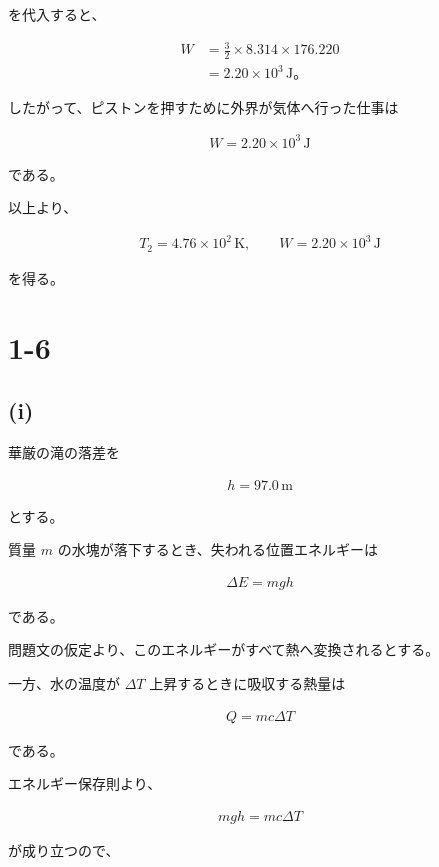 \documentclass[platex,dvipdfmx,a4paper]{jsarticle}
\begin{document}
を代入すると、

\begin{align*}
W
&=
\frac32
\times
8.314
\times
176.220 \\
&=
2.20\times10^3\,\mathrm{J}。
\end{align*}

したがって、ピストンを押すために外界が気体へ行った仕事は

\begin{align*}
W
=
2.20\times10^3\,\mathrm{J}
\end{align*}

である。

以上より、

\begin{align*}
T_2
=
4.76\times10^2\,\mathrm{K},
\qquad
W
=
2.20\times10^3\,\mathrm{J}
\end{align*}

を得る。
\section{1-6}

\subsection{(i)}

華厳の滝の落差を

\begin{align*}
h=97.0\,\mathrm{m}
\end{align*}

とする。

質量 $m$ の水塊が落下するとき、失われる位置エネルギーは

\begin{align*}
\Delta E
=
mgh
\end{align*}

である。

問題文の仮定より、このエネルギーがすべて熱へ変換されるとする。

一方、水の温度が $\Delta T$ 上昇するときに吸収する熱量は

\begin{align*}
Q=mc\Delta T
\end{align*}

である。

エネルギー保存則より、

\begin{align*}
mgh
=
mc\Delta T
\end{align*}

が成り立つので、
\end{document}
